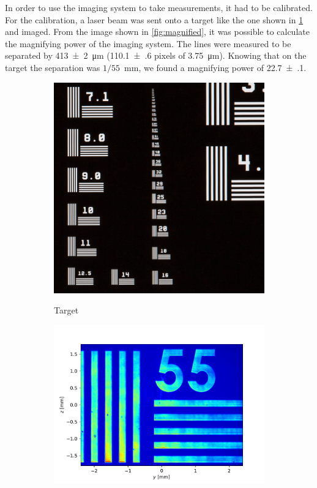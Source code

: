 In order to use the imaging system to take measurements, it had to be calibrated. For the calibration, a laser beam was sent onto a target like the one shown in \cref{fig:target} and imaged. From the image shown in \cref{fig:magnified}, it was possible to calculate the magnifying power of the imaging system. The lines were measured to be separated by \SI{413(2)}{\micro\meter} (\SI{110.1(6)}{} pixels of \SI{3.75}{\micro m}). Knowing that on the target the separation was $1/55$~mm, we found a magnifying power of \SI{22.7(1)}{}.

\begin{figure}
    \hfill
    \begin{subfigure}[b]{0.3 \textwidth}
        \includegraphics[width=\textwidth]{chapters/chapter_3/figures/target.jpg}
        \\
        \caption{Target}
        \label{fig:target}
    \end{subfigure}
    \hfill
    \begin{subfigure}[b]{0.55\textwidth}
        \includegraphics[width=\textwidth]{chapters/chapter_3/figures/magnified}

\end{subfigure}
\end{figure}
